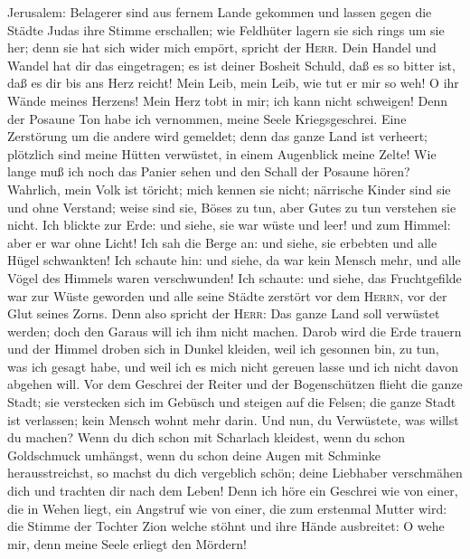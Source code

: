 Jerusalem: Belagerer sind aus fernem Lande gekommen und lassen gegen die
Städte Judas ihre Stimme erschallen;  wie Feldhüter
lagern sie sich rings um sie her; denn sie hat sich wider mich empört,
spricht der \textsc{Herr}.  Dein Handel und Wandel hat
dir das eingetragen; es ist deiner Bosheit Schuld, daß es so bitter ist,
daß es dir bis ans Herz reicht!  Mein Leib, mein Leib,
wie tut er mir so weh! O ihr Wände meines Herzens! Mein Herz tobt in
mir; ich kann nicht schweigen! Denn der Posaune Ton habe ich vernommen,
meine Seele Kriegsgeschrei.  Eine Zerstörung um die
andere wird gemeldet; denn das ganze Land ist verheert; plötzlich sind
meine Hütten verwüstet, in einem Augenblick meine Zelte! 
Wie lange muß ich noch das Panier sehen und den Schall der Posaune
hören?  Wahrlich, mein Volk ist töricht; mich kennen sie
nicht; närrische Kinder sind sie und ohne Verstand; weise sind sie,
Böses zu tun, aber Gutes zu tun verstehen sie nicht.  Ich
blickte zur Erde: und siehe, sie war wüste und leer! und zum Himmel:
aber er war ohne Licht!  Ich sah die Berge an: und siehe,
sie erbebten und alle Hügel schwankten!  Ich schaute hin:
und siehe, da war kein Mensch mehr, und alle Vögel des Himmels waren
verschwunden!  Ich schaute: und siehe, das Fruchtgefilde
war zur Wüste geworden und alle seine Städte zerstört vor dem
\textsc{Herrn}, vor der Glut seines Zorns.  Denn also
spricht der \textsc{Herr}: Das ganze Land soll verwüstet werden; doch
den Garaus will ich ihm nicht machen.  Darob wird die
Erde trauern und der Himmel droben sich in Dunkel kleiden, weil ich
gesonnen bin, zu tun, was ich gesagt habe, und weil ich es mich nicht
gereuen lasse und ich nicht davon abgehen will.  Vor dem
Geschrei der Reiter und der Bogenschützen flieht die ganze Stadt; sie
verstecken sich im Gebüsch und steigen auf die Felsen; die ganze Stadt
ist verlassen; kein Mensch wohnt mehr darin.  Und nun, du
Verwüstete, was willst du machen? Wenn du dich schon mit Scharlach
kleidest, wenn du schon Goldschmuck umhängst, wenn du schon deine Augen
mit Schminke herausstreichst, so machst du dich vergeblich schön; deine
Liebhaber verschmähen dich und trachten dir nach dem Leben!
 Denn ich höre ein Geschrei wie von einer, die in Wehen
liegt, ein Angstruf wie von einer, die zum erstenmal Mutter wird: die
Stimme der Tochter Zion welche stöhnt und ihre Hände ausbreitet: O wehe
mir, denn meine Seele erliegt den Mördern!

